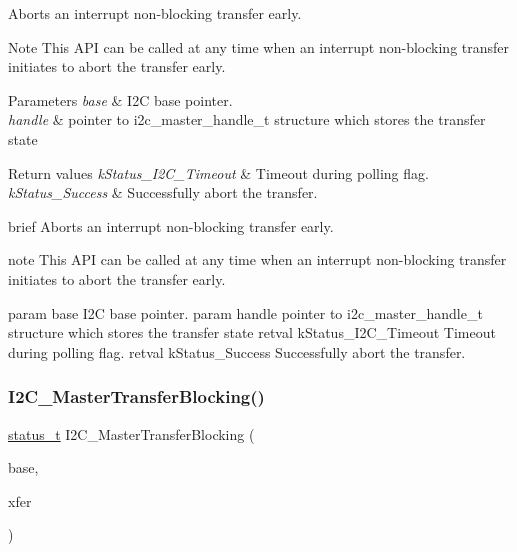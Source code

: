 Aborts an interrupt non-\/blocking transfer early. 

\begin{DoxyNote}{Note}
This A\+PI can be called at any time when an interrupt non-\/blocking transfer initiates to abort the transfer early.
\end{DoxyNote}

\begin{DoxyParams}{Parameters}
{\em base} & I2C base pointer. \\
\hline
{\em handle} & pointer to i2c\+\_\+master\+\_\+handle\+\_\+t structure which stores the transfer state \\
\hline
\end{DoxyParams}

\begin{DoxyRetVals}{Return values}
{\em k\+Status\+\_\+\+I2\+C\+\_\+\+Timeout} & Timeout during polling flag. \\
\hline
{\em k\+Status\+\_\+\+Success} & Successfully abort the transfer.\\
\hline
\end{DoxyRetVals}
brief Aborts an interrupt non-\/blocking transfer early.

note This A\+PI can be called at any time when an interrupt non-\/blocking transfer initiates to abort the transfer early.

param base I2C base pointer. param handle pointer to i2c\+\_\+master\+\_\+handle\+\_\+t structure which stores the transfer state retval k\+Status\+\_\+\+I2\+C\+\_\+\+Timeout Timeout during polling flag. retval k\+Status\+\_\+\+Success Successfully abort the transfer. \mbox{\label{group__i2c__driver_ga35cae3a5b4aa50ce8db28e3eb703a027}} 
\subsubsection{\texorpdfstring{I2C\_MasterTransferBlocking()}{I2C\_MasterTransferBlocking()}}
{\footnotesize\ttfamily \mbox{\hyperlink{group__ksdk__common_gaaabdaf7ee58ca7269bd4bf24efcde092}{status\+\_\+t}} I2\+C\+\_\+\+Master\+Transfer\+Blocking (\begin{DoxyParamCaption}\item[{\mbox{\hyperlink{struct_i2_c___type}{I2\+C\+\_\+\+Type}} $\ast$}]{base,  }\item[{\mbox{\hyperlink{group__i2c__driver_ga0e25c3c153992361c8d359a86b70d3c6}{i2c\+\_\+master\+\_\+transfer\+\_\+t}} $\ast$}]{xfer }\end{DoxyParamCaption})}



